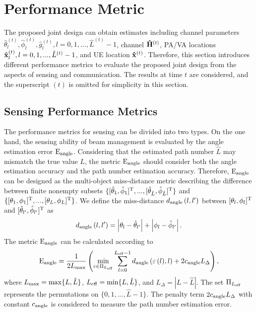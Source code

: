 \documentclass[journal,12pt,onecolumn,draftclsnofoot,]{IEEEtran}
\begin{document}
\vspace{-3mm}
\section{Performance Metric}
The proposed joint design can obtain estimates including channel parameters $\hat \theta _l^{(t )},\hat \phi _l^{(t )},\hat g_l^{(t )},l = 0,1, ...,{\hat L}^{(t )} - 1$, channel ${{{{\bf{\hat H}}}^{(t )}}}$, PA/VA locations ${\bf{\hat x}}_l^{(t )},l = 0,1, ...,{\hat L}^{(t )} - 1$, and UE location ${\bf{\hat x}}^{(t )}$. 
Therefore, this section introduces different performance metrics to evaluate the proposed joint design from the aspects of sensing and communication. 
The results at time $t$ are considered, and the superscript $(t)$ is omitted for simplicity in this section.
\vspace{-3mm}
\subsection{Sensing Performance Metrics}
The performance metrics for sensing can be divided into two types.
On the one hand, the sensing ability of beam management is evaluated by the angle estimation error ${{\rm{E}}_{{\rm{angle}}}}$.
{\color{black}Considering that the estimated path number ${\hat L}$ may mismatch the true value ${L}$, the metric ${{\rm{E}}_{{\rm{angle}}}}$ should consider both the angle estimation accuracy and the path number estimation accuracy. }
Therefore, ${{\rm{E}}_{{\rm{angle}}}}$ can be designed as the multi-object miss-distance metric describing the difference between finite nonempty subsets $\{ [ {{\hat \theta }_1} , {{\hat \phi }_1}]^{\rm T} ,..., [ {{\hat \theta }_{\hat L}}, {{\hat \phi }_{\hat L}}]^{\rm T} \}$ and $\{ [ {{ \theta }_1} , {{ \phi }_1}]^{\rm T} ,..., [ {{ \theta }_{ L}}, {{ \phi }_{ L}}]^{\rm T} \}$. We define the miss-distance $d_{\rm angle}\left( l,l' \right)$ between $[ {{ \theta }_l} , {{ \phi }_l}]^{\rm T}$ and $[ {{\hat \theta }_{l'}}, {{\hat \phi }_{l'}}]^{\rm T}$ as 
\begin{equation}
d_{\rm angle}\left( l,l' \right)=\left| {\theta _{l}}-{{\hat \theta }_{l'}} \right| + \left| {\phi _{l}}-{{\hat \phi }_{l'}} \right| .
\end{equation}
\noindent The metric ${{\rm{E}}_{{\rm{angle}}}}$ can be calculated according to \cite{a16} 
\begin{equation}
\label{29}
{{\rm{E}}_{{\rm{angle}}}} = \frac{1}{{2{L_{{\rm{max}}}}}}\left({\mathop {\min }\limits_{\varepsilon \in {{\rm{\Pi }}_{{L_{{\rm{eff}}}}}}} \mathop \sum \limits_{l = 0}^{{L_{{\rm{eff}}}} - 1}
d_{\rm angle}\left( {\varepsilon \left(l \right)},l \right)+ 2{c_{{\rm{angle}}}}{L_{\rm{\Delta }}}} \right),
\end{equation}
\noindent where ${L_{\max }} = {\rm{max}}\{ {L,{{\hat L}}} \}$, ${L_{{\rm{eff}}}} = {\rm{min}}\{ {L,{{\hat L}}} \}$, and ${L_\Delta } = | {L - {{\hat L}}} |$. The set ${{\rm{\Pi }}_{{L_{{\rm{eff}}}}}}$ represents the permutations on $\{0,1,...,{{\hat L}}-1\}$.
The penalty term $2{c_{{\rm{angle}}}}{L_\Delta }$ with constant ${c_{{\rm{angle}}}}$ is considered to measure the path number estimation error.
\end{document}
